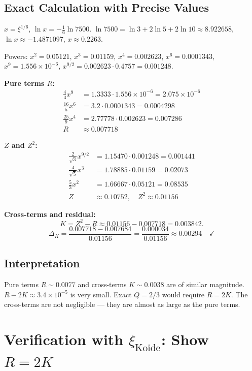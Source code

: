 \subsection{Exact Calculation with Precise Values}

$x=\xi^{1/6}$, $\ln x=-\tfrac{1}{6}\ln7500$.
$\ln7500=\ln3+2\ln5+2\ln10\approx8.922658$,
$\ln x\approx-1.4871097$, $x\approx0.2263$.

Powers:
$x^2=0.05121$, $x^3=0.01159$, $x^4=0.002623$,
$x^6=0.0001343$, $x^9=1.556\times10^{-6}$,
$x^{9/2}=0.002623\cdot0.4757=0.001248$.

\textbf{Pure terms $R$:}
\begin{align*}
  \tfrac{4}{3}x^9 &= 1.3333\cdot1.556\times10^{-6}=2.075\times10^{-6} \\
  \tfrac{16}{5}x^6 &= 3.2\cdot0.0001343=0.0004298 \\
  \tfrac{25}{9}x^4 &= 2.77778\cdot0.002623=0.007286 \\
  R &\approx 0.007718
\end{align*}

\textbf{$Z$ and $Z^2$:}
\begin{align*}
  \tfrac{2}{\sqrt{3}}x^{9/2} &= 1.15470\cdot0.001248=0.001441 \\
  \tfrac{4}{\sqrt{5}}x^3 &= 1.78885\cdot0.01159=0.02073 \\
  \tfrac{5}{3}x^2 &= 1.66667\cdot0.05121=0.08535 \\
  Z &\approx 0.10752, \quad Z^2\approx0.01156
\end{align*}

\textbf{Cross-terms and residual:}
\[
  K=Z^2-R\approx0.01156-0.007718=0.003842.
\]
\[
  \Delta_K=\frac{0.007718-0.007684}{0.01156}
  =\frac{0.000034}{0.01156}\approx\mathbf{0.00294}\quad\checkmark
\]

\subsection{Interpretation}

Pure terms $R\sim0.0077$ and cross-terms $K\sim0.0038$ are of similar magnitude.
$R-2K\approx3.4\times10^{-5}$ is very small.
Exact $Q=2/3$ would require $R=2K$.
The cross-terms are not negligible --- they are almost as large as the pure terms.

\section{Verification with $\xi_{\text{Koide}}$: Show $R=2K$}


